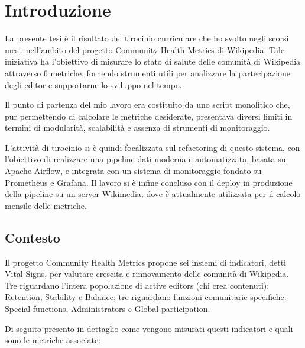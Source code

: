\chapter{Introduzione}
\label{cha:intro}


La presente tesi è il risultato del tirocinio curriculare che ho svolto negli scorsi mesi, nell'ambito del progetto Community Health Metrics di Wikipedia.
Tale iniziativa ha l’obiettivo di misurare lo stato di salute delle comunità di Wikipedia attraverso 6 metriche,
fornendo strumenti utili per analizzare la partecipazione degli editor e supportarne lo sviluppo nel tempo.

Il punto di partenza del mio lavoro era costituito da uno script monolitico che,
pur permettendo di calcolare le metriche desiderate, presentava diversi limiti in termini di modularità,
scalabilità e assenza di strumenti di monitoraggio.

L’attività di tirocinio si è quindi focalizzata sul refactoring di questo sistema,
con l’obiettivo di realizzare una pipeline dati moderna e automatizzata, basata su Apache Airflow, e integrata con un sistema di monitoraggio fondato su Prometheus e Grafana.
Il lavoro si è infine concluso con il deploy in produzione della pipeline su un server Wikimedia,
dove è attualmente utilizzata per il calcolo mensile delle metriche.

\section{Contesto}
\label{sec:contesto}
Il progetto Community Health Metrics propone sei insiemi di indicatori, detti Vital Signs, per valutare crescita e rinnovamento delle comunità di Wikipedia.
Tre riguardano l’intera popolazione di active editors (chi crea contenuti):
Retention, Stability e Balance;
tre riguardano funzioni comunitarie specifiche: Special functions, Administrators e Global participation.

Di seguito presento in dettaglio come vengono misurati questi indicatori e quali sono le metriche associate:

